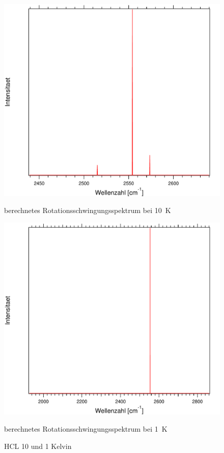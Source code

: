 \begin{figure}[H]
\centering	
	\begin{minipage}{0.47\linewidth}
	\includegraphics[width=\linewidth]{Bilder/10HCL.pdf}
	\caption{berechnetes Rotationsschwingungsspektrum bei 10~K}
	\end{minipage}
\begin{minipage}{0.47\linewidth}
	\includegraphics[width=\linewidth]{Bilder/1HCL.pdf}
	\caption{berechnetes Rotationsschwingungsspektrum bei 1~K}
	\end{minipage}
	
	\caption{HCL 10 und 1 Kelvin}
	
	
	
\end{figure}

